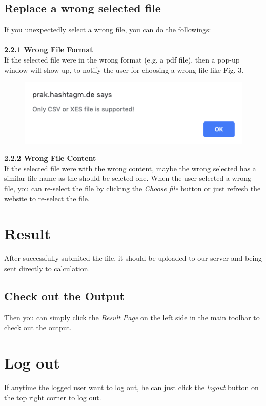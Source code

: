 \documentclass[runningheads]{llncs}
\begin{document}
\subsection{Replace a wrong selected file}
If you unexpectedly select a wrong file, you can do the followings:\\\\
\noindent
\textbf{2.2.1 Wrong File Format\\}
If the selected file were in the wrong format (e.g. a pdf file), then a pop-up window will show up, to notify the user for choosing a wrong file like Fig. 3.\\
\begin{figure}[h]	
	\centering
	\includegraphics[scale=0.5]{wrong.png}
	\caption{}
	\label{fig:label}
\end{figure}

\noindent
\textbf{2.2.2 Wrong File Content\\}
If the selected file were with the wrong content, maybe the wrong selected has a similar file name as the should be seleted one. When the user selected a wrong file, you can re-select the file by clicking the \textit{Choose file} button or just refresh the website to re-select the file.

\section{Result}
After successfully submited the file, it should be uploaded to our server and being sent directly to calculation. 

\subsection{Check out the Output}
Then you can simply click the \textit{Result Page} on the left side in the main toolbar to check out the output.

\section{Log out}
If anytime the logged user want to log out, he can just click the \textit{logout} button on the top right corner to log out.
\end{document}
